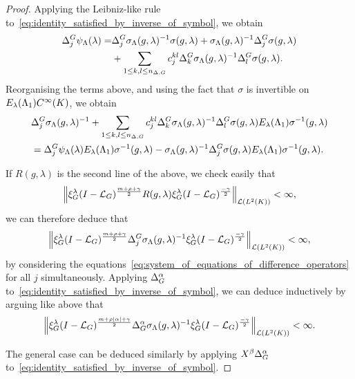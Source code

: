 \begin{proof}
    Applying the Leibniz-like rule to~\eqref{eq:identity_satisfied_by_inverse_of_symbol},
    we obtain
    \begin{align*}
        {\Delta^{G}_{j}} \psi_\Lambda(\lambda)
        =
        &{\Delta^{G}_{j}} \sigma_\Lambda(g, \lambda)^{-1} \sigma(g, \lambda)
        + \sigma_\Lambda(g, \lambda)^{-1} {\Delta^{G}_{j}} \sigma(g, \lambda) \\
        &+ \sum_{1 \leq k, l \leq n_{\Delta, G}} c_j^{k l} {\Delta^{G}_{k}} \sigma_\Lambda(g, \lambda)^{-1} {\Delta^{G}_{l}} \sigma(g, \lambda).
    \end{align*}
    Reorganising the terms above,
    and using the fact that $\sigma$ is invertible on $E_\lambda(\Lambda_1) {C^\infty(K)}$,
    we obtain
    \begin{align}
        &{\Delta^{G}_{j}} \sigma_\Lambda(g, \lambda)^{-1}
        + \sum_{1 \leq k, l \leq n_{\Delta, G}} c_j^{k l} {\Delta^{G}_{k}} \sigma_\Lambda(g, \lambda)^{-1} {\Delta^{G}_{l}} \sigma(g, \lambda) E_\lambda(\Lambda_1) \sigma^{-1}(g, \lambda) \notag\\
        &=
        {\Delta^{G}_{j}} \psi_\Lambda(\lambda) E_\lambda(\Lambda_1) \sigma^{-1}(g, \lambda)
        - \sigma_\Lambda(g, \lambda)^{-1} {\Delta^{G}_{j}} \sigma(g, \lambda) E_\lambda(\Lambda_1) \sigma^{-1}(g, \lambda).
        \label{eq:system_of_equations_of_difference_operators}
    \end{align}

    If $R(g, \lambda)$ is the second line of the above,
    we check easily that
    \begin{align*}
        \norm [\Lin {\Lebesgue 2 \CompactGroup}] {%
            \Rep \lambda \BesselPotential {m + \rho + \gamma}
            R(g, \lambda)
            \Rep \lambda \BesselPotential {-\gamma}
        } < \infty,
    \end{align*}
    we can therefore deduce that
    \begin{align*}
        \norm [\Lin {\Lebesgue 2 \CompactGroup}] {%
            \Rep \lambda \BesselPotential {m + \rho + \gamma}
            \DifferenceOperator j \sigma_\Lambda(g, \lambda)^{-1}
            \Rep \lambda \BesselPotential {-\gamma}
        } < \infty,
    \end{align*}
    by considering the equations~\eqref{eq:system_of_equations_of_difference_operators} for all $j$ simultaneously.
    Applying ${\Delta_{G}^{\alpha}}$ to~\eqref{eq:identity_satisfied_by_inverse_of_symbol},
    we can deduce inductively by arguing like above that
    \begin{align*}
        \norm [\Lin {\Lebesgue 2 \CompactGroup}] {%
            \Rep \lambda \BesselPotential {m + \rho \abs \alpha + \gamma}
            \DifferenceOperatorOrder \alpha \sigma_\Lambda(g, \lambda)^{-1}
            \Rep \lambda \BesselPotential {-\gamma}
        } < \infty.
    \end{align*}

    The general case can be deduced similarly by applying $\LeftDifferentialOperator \beta \DifferenceOperatorOrder \alpha$ to~\eqref{eq:identity_satisfied_by_inverse_of_symbol}.
\end{proof}

